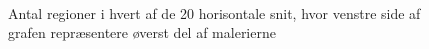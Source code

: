 \begin{figure}[h!]
	\begin{center}
		\includegraphics[width=0.9]{afsnit/resultater/billeder/cut2cut3eatsperratio.png}
	\end{center}
	\caption{Antal regioner i hvert af de 20 horisontale snit, hvor venstre side af grafen repræsentere øverst del af malerierne}
	\label{antal_regioner_horisontale_cut}
\end{figure}
